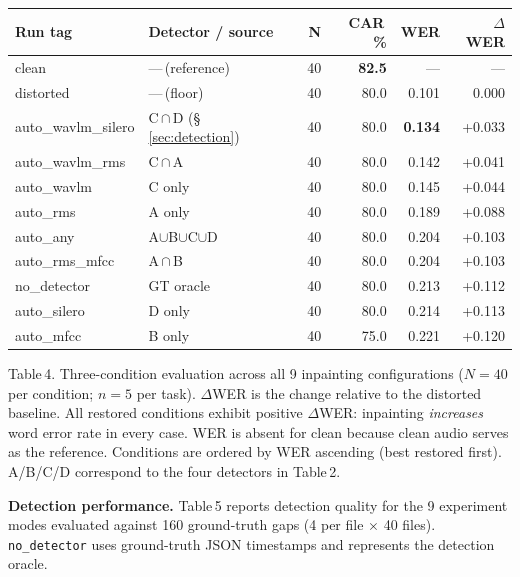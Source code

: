 \documentclass[9pt,twocolumn]{article}
\begin{document}
{\footnotesize\setlength{\tabcolsep}{2.8pt}
\begin{tabularx}{\columnwidth}{lXrrrr}
\toprule
\textbf{Run tag} & \textbf{Detector / source} & \textbf{N}
  & \textbf{CAR\,\%} & \textbf{WER} & \textbf{$\Delta$WER} \\
\midrule
\rowcolor{cData!12}
clean            & ---\,(reference)    & 40 & \textbf{82.5} & ---   & ---   \\
\rowcolor{cDist!12}
distorted        & ---\,(floor)        & 40 & 80.0          & 0.101 & 0.000 \\
\midrule
auto\_wavlm\_silero & C\,$\cap$\,D (§\,\ref{sec:detection}) & 40 & 80.0 & \textbf{0.134} & +0.033 \\
auto\_wavlm\_rms    & C\,$\cap$\,A        & 40 & 80.0 & 0.142 & +0.041 \\
auto\_wavlm         & C only              & 40 & 80.0 & 0.145 & +0.044 \\
auto\_rms           & A only              & 40 & 80.0 & 0.189 & +0.088 \\
auto\_any           & A$\cup$B$\cup$C$\cup$D & 40 & 80.0 & 0.204 & +0.103 \\
auto\_rms\_mfcc     & A\,$\cap$\,B        & 40 & 80.0 & 0.204 & +0.103 \\
no\_detector        & GT oracle           & 40 & 80.0 & 0.213 & +0.112 \\
auto\_silero        & D only              & 40 & 80.0 & 0.214 & +0.113 \\
\rowcolor{cDist!8}
auto\_mfcc          & B only              & 40 & 75.0 & 0.221 & +0.120 \\
\bottomrule
\end{tabularx}
}
\vspace{1pt}
{\tiny Table\,4.
Three-condition evaluation across all 9 inpainting configurations
($N{=}40$ per condition; $n{=}5$ per task).
$\Delta$WER is the change relative to the distorted baseline.
All restored conditions exhibit positive $\Delta$WER:
inpainting \emph{increases} word error rate in every case.
WER is absent for clean because clean audio serves as the reference.
Conditions are ordered by WER ascending (best restored first).
A/B/C/D correspond to the four detectors in Table\,2.}
\vspace{4pt}

\noindent\textbf{Detection performance.}
Table\,5 reports detection quality for the 9 experiment modes
evaluated against 160 ground-truth gaps (4 per file $\times$ 40 files).
\texttt{no\_detector} uses ground-truth JSON timestamps and represents the
detection oracle.
\end{document}

